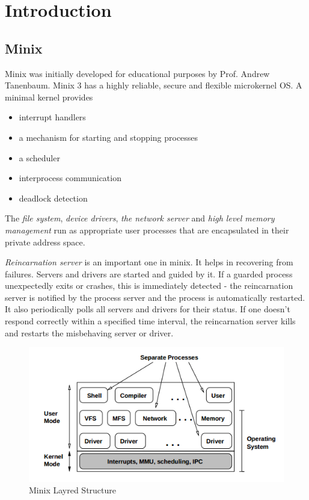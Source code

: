 \chapter{Introduction}
\label{Basics of File System}
\section{Minix}
Minix was initially developed for educational purposes by Prof. Andrew
Tanenbaum.
Minix 3 has a highly reliable, secure and flexible microkernel OS. A minimal kernel provides 
\begin{itemize}
\item interrupt handlers
\item a mechanism for starting and stopping processes
\item a scheduler
\item interprocess communication
\item deadlock detection
\end{itemize}

The \emph{file system}, \emph{device drivers}, \emph{the network server} and \emph{high level memory management} run as appropriate user processes that are encapsulated in their private address space.

\emph{Reincarnation server} is an important one in minix. It helps in recovering from failures. Servers and drivers are started and guided by it. If a guarded process unexpectedly exits or crashes, this is immediately detected - the reincarnation
server is notified by the process server and the process is automatically restarted. It also periodically polls all servers and drivers for their status.
If one doesn't respond correctly within a specified time interval, the
reincarnation server kills and restarts the misbehaving server or driver.
\begin{figure}[!htb]
    \centering
    \includegraphics[scale=0.5]{img/fourlevel.png}
    \caption{Minix Layred Structure}
\end{figure}

